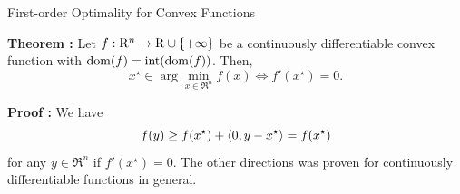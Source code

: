 \documentclass[9pt]{beamer}
\begin{document}
\begin{frame}{First-order Optimality for Convex Functions}

  \textbf{Theorem : } Let $f:\mathrm{R}^n\to\mathrm{R}\cup\{+\infty\}$ be a continuously differentiable convex function with $\operatorname{dom}(f)=\operatorname{int}(\operatorname{dom} (f))$. Then,
  \[
    x^\star \in \arg\min_{x\in \Re^n} f(x) \iff  f'(x^\star) =0.
  \]

  \textbf{Proof :} We have 
  \[
    f(y) \geq f(x^\star) + \left<0, y-x^\star\right> =f(x^\star)
  \]
  for any $y \in \Re^n$ if $f'(x^\star)=0$. The other directions was proven for continuously differentiable functions in general.

\end{frame}
\end{document}
